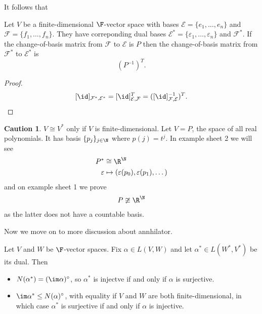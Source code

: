 \documentclass[a4paper]{article}
\newcommand*{\ann}{\circ}
\newcommand*{\basis}{\mathcal}
\theoremstyle{definition}
\newtheorem*{caution}{Caution}
\begin{document}
It follows that
\begin{lemma}
  Let \(V\) be a finite-dimensional \(\F\)-vector space with bases \(\basis E = \{e_1,\dots,e_n\}\) and \(\basis F = \{f_1,\dots,f_n\}\). They have correponding dual bases \(\basis E^* = \{\varepsilon_1,\dots, \varepsilon_n\}\) and \(\basis F^*\). If the change-of-basis matrix from \(\basis F\) to \(\basis E\) is \(P\) then the change-of-basis matrix from \(\basis F^*\) to \(\basis E^*\) is
  \[
    (P^{-1})^T.
  \]
\end{lemma}

\begin{proof}
  \[
    [\id]_{\basis F^*,\basis E^*} = [\id]_{\basis E, \basis F}^T = ([\id]_{\basis F, \basis E}^{-1})^T.
  \]
\end{proof}

\begin{caution}
  \(V \cong V^*\) only if \(V\) is finite-dimensional. Let \(V = P\), the space of all real polynomials. It has basis \(\{p_j\}_{j\in \N}\) where \(p(j) = t^j\). In example sheet 2 we will see
\begin{align*}
  P^* &\cong \R^\N \\
  \varepsilon &\mapsto (\varepsilon(p_0), \varepsilon(p_1), \dots)
\end{align*}
and on example sheet 1 we prove
\[
  P \ncong \R^\N
\]
as the latter does not have a countable basis.
\end{caution}

Now we move on to more discussion about annhilator.

\begin{lemma}
  Let \(V\) and \(W\) be \(\F\)-vector spaces. Fix \(\alpha \in L(V,W)\) and let \(\alpha^* \in L(W^*, V^*)\) be its dual. Then
  \begin{itemize}
  \item \(N(\alpha^*) = (\im \alpha)^\ann\), so \(\alpha^*\) is injectve if and only if \(\alpha\) is surjective.
  \item \(\im \alpha^* \leq N(\alpha)^\ann\), with equality if \(V\) and \(W\) are both finite-dimensional, in which case \(\alpha^*\) is surjective if and only if \(\alpha\) is injective.
  \end{itemize}
\end{lemma}
\end{document}
